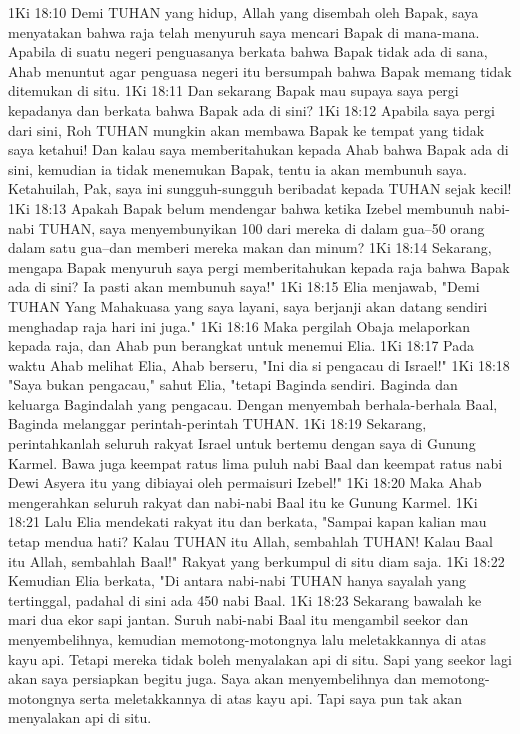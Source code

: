 1Ki 18:10  Demi TUHAN yang hidup, Allah yang disembah oleh Bapak, saya menyatakan bahwa raja telah menyuruh saya mencari Bapak di mana-mana. Apabila di suatu negeri penguasanya berkata bahwa Bapak tidak ada di sana, Ahab menuntut agar penguasa negeri itu bersumpah bahwa Bapak memang tidak ditemukan di situ.
1Ki 18:11  Dan sekarang Bapak mau supaya saya pergi kepadanya dan berkata bahwa Bapak ada di sini?
1Ki 18:12  Apabila saya pergi dari sini, Roh TUHAN mungkin akan membawa Bapak ke tempat yang tidak saya ketahui! Dan kalau saya memberitahukan kepada Ahab bahwa Bapak ada di sini, kemudian ia tidak menemukan Bapak, tentu ia akan membunuh saya. Ketahuilah, Pak, saya ini sungguh-sungguh beribadat kepada TUHAN sejak kecil!
1Ki 18:13  Apakah Bapak belum mendengar bahwa ketika Izebel membunuh nabi-nabi TUHAN, saya menyembunyikan 100 dari mereka di dalam gua--50 orang dalam satu gua--dan memberi mereka makan dan minum?
1Ki 18:14  Sekarang, mengapa Bapak menyuruh saya pergi memberitahukan kepada raja bahwa Bapak ada di sini? Ia pasti akan membunuh saya!"
1Ki 18:15  Elia menjawab, "Demi TUHAN Yang Mahakuasa yang saya layani, saya berjanji akan datang sendiri menghadap raja hari ini juga."
1Ki 18:16  Maka pergilah Obaja melaporkan kepada raja, dan Ahab pun berangkat untuk menemui Elia.
1Ki 18:17  Pada waktu Ahab melihat Elia, Ahab berseru, "Ini dia si pengacau di Israel!"
1Ki 18:18  "Saya bukan pengacau," sahut Elia, "tetapi Baginda sendiri. Baginda dan keluarga Bagindalah yang pengacau. Dengan menyembah berhala-berhala Baal, Baginda melanggar perintah-perintah TUHAN.
1Ki 18:19  Sekarang, perintahkanlah seluruh rakyat Israel untuk bertemu dengan saya di Gunung Karmel. Bawa juga keempat ratus lima puluh nabi Baal dan keempat ratus nabi Dewi Asyera itu yang dibiayai oleh permaisuri Izebel!"
1Ki 18:20  Maka Ahab mengerahkan seluruh rakyat dan nabi-nabi Baal itu ke Gunung Karmel.
1Ki 18:21  Lalu Elia mendekati rakyat itu dan berkata, "Sampai kapan kalian mau tetap mendua hati? Kalau TUHAN itu Allah, sembahlah TUHAN! Kalau Baal itu Allah, sembahlah Baal!" Rakyat yang berkumpul di situ diam saja.
1Ki 18:22  Kemudian Elia berkata, "Di antara nabi-nabi TUHAN hanya sayalah yang tertinggal, padahal di sini ada 450 nabi Baal.
1Ki 18:23  Sekarang bawalah ke mari dua ekor sapi jantan. Suruh nabi-nabi Baal itu mengambil seekor dan menyembelihnya, kemudian memotong-motongnya lalu meletakkannya di atas kayu api. Tetapi mereka tidak boleh menyalakan api di situ. Sapi yang seekor lagi akan saya persiapkan begitu juga. Saya akan menyembelihnya dan memotong-motongnya serta meletakkannya di atas kayu api. Tapi saya pun tak akan menyalakan api di situ.
